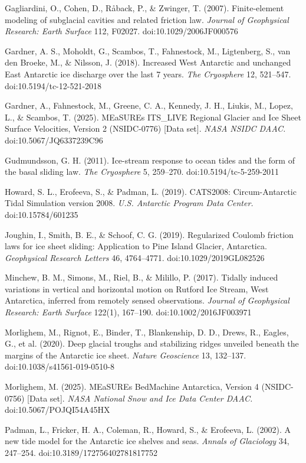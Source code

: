 \documentclass[11pt]{article}
\begin{document}
Gagliardini, O., Cohen, D., Råback, P., \& Zwinger, T. (2007). Finite-element modeling of subglacial cavities and related friction law. \emph{Journal of Geophysical Research: Earth Surface} 112, F02027. doi:10.1029/2006JF000576


Gardner, A. S., Moholdt, G., Scambos, T., Fahnestock, M., Ligtenberg, S., van den Broeke, M., \& Nilsson, J. (2018). Increased West Antarctic and unchanged East Antarctic ice discharge over the last 7 years. \emph{The Cryosphere} 12, 521–547. doi:10.5194/tc-12-521-2018


Gardner, A., Fahnestock, M., Greene, C. A., Kennedy, J. H., Liukis, M., Lopez, L., \& Scambos, T. (2025). MEaSUREs ITS\_LIVE Regional Glacier and Ice Sheet Surface Velocities, Version 2 (NSIDC-0776) [Data set]. \emph{NASA NSIDC DAAC.} doi:10.5067/JQ6337239C96


Gudmundsson, G. H. (2011). Ice-stream response to ocean tides and the form of the basal sliding law. \emph{The Cryosphere} 5, 259–270. doi:10.5194/tc-5-259-2011


Howard, S. L., Erofeeva, S., \& Padman, L. (2019). CATS2008: Circum-Antarctic Tidal Simulation version 2008. \emph{U.S. Antarctic Program Data Center.} doi:10.15784/601235


Joughin, I., Smith, B. E., \& Schoof, C. G. (2019). Regularized Coulomb friction laws for ice sheet sliding: Application to Pine Island Glacier, Antarctica. \emph{Geophysical Research Letters} 46, 4764–4771. doi:10.1029/2019GL082526


Minchew, B. M., Simons, M., Riel, B., \& Milillo, P. (2017). Tidally induced variations in vertical and horizontal motion on Rutford Ice Stream, West Antarctica, inferred from remotely sensed observations. \emph{Journal of Geophysical Research: Earth Surface} 122(1), 167–190. doi:10.1002/2016JF003971

Morlighem, M., Rignot, E., Binder, T., Blankenship, D. D., Drews, R., Eagles, G., et al. (2020). Deep glacial troughs and stabilizing ridges unveiled beneath the margins of the Antarctic ice sheet. \emph{Nature Geoscience} 13, 132–137. doi:10.1038/s41561-019-0510-8


Morlighem, M. (2025). MEaSUREs BedMachine Antarctica, Version 4 (NSIDC-0756) [Data set]. \emph{NASA National Snow and Ice Data Center DAAC.} doi:10.5067/POJQI54A45HX


Padman, L., Fricker, H. A., Coleman, R., Howard, S., \& Erofeeva, L. (2002). A new tide model for the Antarctic ice shelves and seas. \emph{Annals of Glaciology} 34, 247–254. doi:10.3189/172756402781817752
\end{document}
